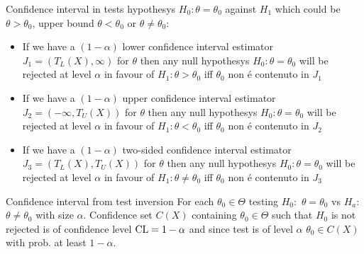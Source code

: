 \documentclass[asd-beamer.tex]{subfiles}%
\begin{document}
\begin{frame}{Confidence interval in tests hypothesys}
$H_0: \theta=\theta_0$ against $H_1$ which could be $\theta>\theta_0$, upper bound $\theta<\theta_0$ or $\theta\neq\theta_0$:
\begin{itemize}
    \item If we have a $(1-\alpha)$ lower confidence interval estimator $J_1=(T_L(X),\infty)$ for $\theta$ then any null hypothesys $H_0: \theta=\theta_0$ will be rejected at level $\alpha$ in favour of $H_1:\theta>\theta_0$ iff $\theta_0$ non \'e contenuto in $J_1$
\item If we have a $(1-\alpha)$ upper confidence interval estimator $J_2=(-\infty,T_U(X))$ for $\theta$ then any null hypothesys $H_0: \theta=\theta_0$ will be rejected at level $\alpha$ in favour of $H_1: \theta<\theta_0$ iff $\theta_0$ non \'e contenuto in $J_2$
\item If we have a $(1-\alpha)$ two-sided confidence interval estimator $J_3=(T_L(X),T_U(X))$ for $\theta$ then any null hypothesys $H_0: \theta=\theta_0$ will be rejected at level $\alpha$ in favour of $H_1: \theta\neq\theta_0$ iff $\theta_0$ non \'e contenuto in $J_3$
\end{itemize}
\end{frame}

\begin{frame}{Confidence interval from test inversion}\frameintoc
For each $\theta_0\in\Theta$ testing $H_0:$ $\theta=\theta_0$ vs $H_a$: $\theta\neq\theta_0$ with size $\alpha$. Confidence set $C(X)$ containing $\theta_0\in\Theta$ such that $H_0$ is not rejected is of confidence level $\operatorname{CL}=1-\alpha$ and since test is of level $\alpha$ $\theta_0\in C(X)$ with prob. at least $1-\alpha$.
\end{frame}
\end{document}
